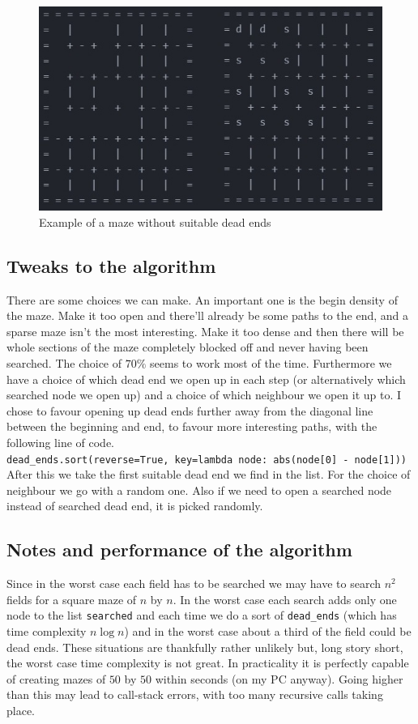 \documentclass[10pt, a4paper, twoside]{amsart}
\newcommand{\1}{\mathbbm{1}}
\begin{document}
\begin{figure}
\centering
        \includegraphics[totalheight=8cm]{nodeadends}
    \caption{Example of a maze without suitable dead ends}
\end{figure}

\subsection{Tweaks to the algorithm}
There are some choices we can make. An important one is the begin density of the maze. Make it too open and there'll already be some paths to the end, and a sparse maze isn't the most interesting. Make it too dense and then there will be whole sections of the maze completely blocked off and never having been searched. The choice of $70\%$ seems to work most of the time.
Furthermore we have a choice of which dead end we open up in each step (or alternatively which searched node we open up) and a choice of which neighbour we open it up to.
I chose to favour opening up dead ends further away from the diagonal line between the beginning and end, to favour more interesting paths, with the following line of code.\\
\verb+dead_ends.sort(reverse=True, key=lambda node: abs(node[0] - node[1]))+\\
After this we take the first suitable dead end we find in the list. For the choice of neighbour we go with a random one. Also if we need to open a searched node instead of searched dead end, it is picked randomly.

\subsection{Notes and performance of the algorithm}
Since in the worst case each field has to be searched we may have to search $n^2$ fields for a square maze of $n$ by $n$. In the worst case each search adds only one node to the list \verb+searched+ and each time we do a sort of \verb+dead_ends+ (which has time complexity $n\log n$) and in the worst case about a third of the field could be dead ends. These situations are thankfully rather unlikely but, long story short, the worst case time complexity is not great. In practicality it is perfectly capable of creating mazes of $50$ by $50$ within seconds (on my PC anyway). Going higher than this may lead to call-stack errors, with too many recursive calls taking place.\\
\end{document}
